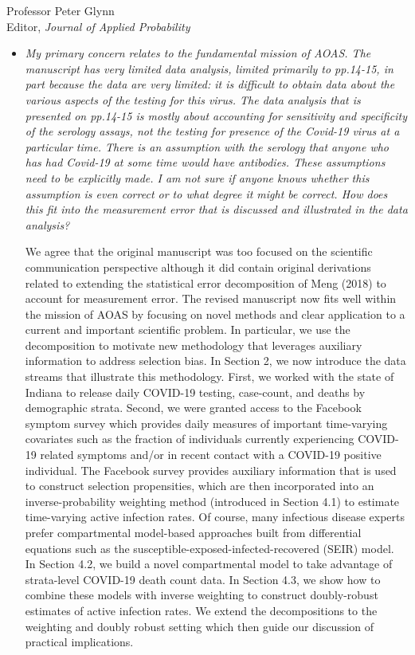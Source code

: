 \documentclass[11pt]{letter} %
\begin{document}
\begin{letter}{Professor
	Peter Glynn\\
	Editor, {\em Journal of Applied Probability}}
\begin{itemize}
\item {\it My primary concern relates to the fundamental mission of AOAS. The manuscript has very limited data analysis, limited primarily to pp.14-15, in part because the data are very limited: it is difficult to obtain data about the various aspects of the testing for this virus. The data analysis that is presented on pp.14-15 is mostly about accounting for sensitivity and specificity of the serology assays, not the testing for presence of the Covid-19 virus at a particular time.  There is an assumption with the serology that anyone who has had Covid-19 at some time would have antibodies. These assumptions need to be explicitly made.  I am not sure if anyone knows whether this assumption is even correct or to what degree it might be correct. How does this fit into the measurement error that is discussed and illustrated in the data analysis?}

\vspace{5mm}
We agree that the original manuscript was too focused on the scientific communication perspective although it did contain original derivations related to extending the statistical error decomposition of Meng (2018) to account for measurement error.  The revised manuscript now fits well within the mission of AOAS by focusing on novel methods and clear application to a current and important scientific problem. In particular, we use the decomposition to motivate new methodology that leverages auxiliary information to address selection bias. In Section 2, we now introduce the data streams that illustrate this methodology. First, we worked with the state of Indiana to release daily COVID-19 testing, case-count, and deaths by demographic strata. Second, we were granted access to the Facebook symptom survey which provides daily measures of important time-varying covariates such as the fraction of individuals currently experiencing COVID-19 related symptoms and/or in recent contact with a COVID-19 positive individual.  The Facebook survey provides auxiliary information that is used to construct selection propensities, which are then incorporated into an inverse-probability weighting method (introduced in Section 4.1) to estimate time-varying active infection rates. Of course, many infectious disease experts prefer compartmental model-based approaches built from differential equations such as the susceptible-exposed-infected-recovered (SEIR) model.  In Section 4.2, we build a novel compartmental model to take advantage of strata-level COVID-19 death count data.  In Section 4.3, we show how to combine these models with inverse weighting to construct doubly-robust estimates of active infection rates.  We extend the decompositions to the weighting and doubly robust setting which then guide our discussion of practical implications.
\vspace{5mm}



\end{itemize}
\end{letter}
\end{document}
